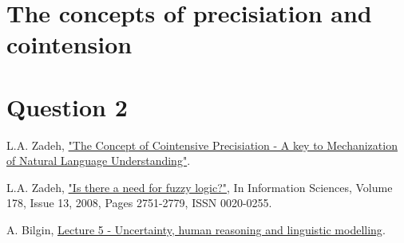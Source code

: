 \documentclass[11pt]{article}
\begin{document}
\section*{The concepts of precisiation and cointension}



\section*{Question 2}


\begin{thebibliography}{9}

    L.A. Zadeh,
    \href{http://www.math.s.chiba-u.ac.jp/~yasuda/open2all/Paris06/IPMU2006/HTML/FINALPAPERS/P703.PDF}{"The Concept of Cointensive Precisiation - A key to Mechanization of Natural Language Understanding"}.

    L.A. Zadeh,
    \href{http://www.sciencedirect.com/science/article/pii/S0020025508000716}{"Is there a need for fuzzy logic?"}, In Information Sciences, Volume 178, Issue 13, 2008, Pages 2751-2779, ISSN 0020-0255.

    A. Bilgin,
    \href{https://drive.google.com/file/d/1j505Rpb5mCb6EVXmwBEv5caM-nmYwecJ/view?usp=sharing}{Lecture 5 - Uncertainty, human reasoning and linguistic modelling}.
\end{thebibliography}
\end{document}
